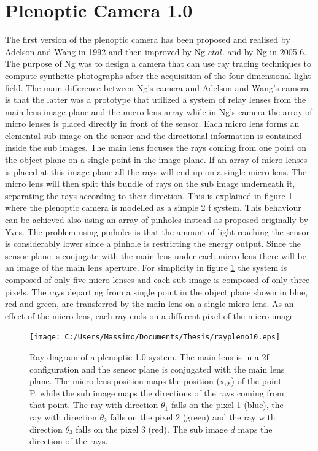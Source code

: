\section{Plenoptic Camera 1.0}
\label{sec:camera10}
The first version of the plenoptic camera has been proposed and realised by Adelson and Wang in 1992 \cite{adelson1992single} and then improved by Ng $et al.$ \cite{ng2005light} and by Ng \cite{ng2006digital}in 2005-6.\\ The purpose of Ng was to design a camera that can use ray tracing techniques to compute synthetic photographs after the acquisition of the four dimensional light field. The main difference between Ng's camera and Adelson and Wang's camera is that the latter was a prototype that utilized a system of relay lenses from the main lens image plane and the micro lens array \cite{ng2005light} while in Ng's camera the array of micro lenses is placed directly in front of the sensor. Each micro lens forms an elemental sub image on the sensor and the directional information is contained inside the sub images. The main lens focuses the rays coming from one point on the object plane on a single point in the image plane. If an array of micro lenses is placed at this image plane all the rays will end up on a single micro lens. The micro lens will then split this bundle of rays on the sub image underneath it, separating the rays according to their direction. This is explained in figure \ref{fig:plenoptic3} where the plenoptic camera is modelled as a simple 2 f system. This behaviour can be achieved also using an array of pinholes instead as proposed originally by Yves. The problem using pinholes is that the amount of light reaching the sensor is considerably lower since a pinhole is restricting the energy output. Since the sensor plane is conjugate with the main lens under each micro lens there will be an image of the main lens aperture. For simplicity in figure \ref{fig:plenoptic3} the system is composed of only five micro lenses and each sub image is composed of only three pixels. The rays departing from a single point in the object plane shown in blue, red and green, are transferred by the main lens on a single micro lens. As an effect of the micro lens, each ray ends on a different pixel of the micro image.
\begin{figure}[H]
\centering
\texttt{[image: C:/Users/Massimo/Documents/Thesis/raypleno10.eps]}
\caption{\label{fig:plenoptic3}Ray diagram of a plenoptic 1.0 system. The main lens is in a 2f configuration and the sensor plane is conjugated with the main lens plane. The micro lens position maps the position (x,y) of the point P, while the sub image maps the directions of the rays coming from that point. The ray with direction $\theta_1$ falls on the pixel 1 (blue), the ray with direction $\theta_2$ falls on the pixel 2 (green) and the ray with direction $\theta_3$ falls on the pixel 3 (red). The sub image $d$ maps the direction of the rays.  }
\end{figure}
